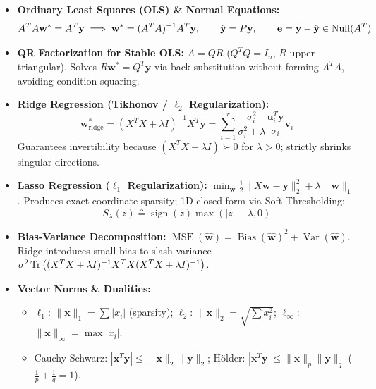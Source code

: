 \begin{tcolorbox}[breakable, colback=primarylight!30, colframe=primarydark, title={\large \textbf{1. Linear Algebra, Subspaces \& Regularized Regression (Weeks 1, 3--4)}}]
\begin{itemize}[leftmargin=*, noitemsep, topsep=2pt]
\begin{itemize}[leftmargin=*, noitemsep]
    \end{itemize}
    \item \textbf{Ordinary Least Squares (OLS) \& Normal Equations:}
    \begin{equation*}
    A^T A \mathbf{w}^* = A^T \mathbf{y} \implies \mathbf{w}^* = (A^T A)^{-1} A^T \mathbf{y}, \qquad \hat{\mathbf{y}} = P\mathbf{y}, \qquad \mathbf{e} = \mathbf{y} - \hat{\mathbf{y}} \in \operatorname{Null}(A^T)
    \end{equation*}
    \item \textbf{QR Factorization for Stable OLS:} $A = QR$ ($Q^T Q = I_n$, $R$ upper triangular). Solves $R \mathbf{w}^* = Q^T \mathbf{y}$ via back-substitution without forming $A^T A$, avoiding condition squaring.
    \item \textbf{Ridge Regression (Tikhonov / $\ell_2$ Regularization):}
    \begin{equation*}
    \mathbf{w}_{\text{ridge}}^* = (X^T X + \lambda I)^{-1} X^T \mathbf{y} = \sum_{i=1}^r \frac{\sigma_i^2}{\sigma_i^2 + \lambda} \frac{\mathbf{u}_i^T \mathbf{y}}{\sigma_i} \mathbf{v}_i
    \end{equation*}
    Guarantees invertibility because $(X^T X + \lambda I) \succ 0$ for $\lambda > 0$; strictly shrinks singular directions.
    \item \textbf{Lasso Regression ($\ell_1$ Regularization):} $\min_{\mathbf{w}} \frac{1}{2}\|X\mathbf{w} - \mathbf{y}\|_2^2 + \lambda \|\mathbf{w}\|_1$. Produces exact coordinate sparsity; 1D closed form via Soft-Thresholding:
    \begin{equation*}
    S_\lambda(z) \triangleq \operatorname{sign}(z)\max(|z| - \lambda, 0)
    \end{equation*}
    \item \textbf{Bias-Variance Decomposition:} $\operatorname{MSE}(\hat{\mathbf{w}}) = \operatorname{Bias}(\hat{\mathbf{w}})^2 + \operatorname{Var}(\hat{\mathbf{w}})$. Ridge introduces small bias to slash variance $\sigma^2 \operatorname{Tr}\big((X^T X + \lambda I)^{-1} X^T X (X^T X + \lambda I)^{-1}\big)$.
    \item \textbf{Vector Norms \& Dualities:}
    \begin{itemize}[leftmargin=*, noitemsep]
        \item $\ell_1$: $\|\mathbf{x}\|_1 = \sum |x_i|$ (sparsity); $\ell_2$: $\|\mathbf{x}\|_2 = \sqrt{\sum x_i^2}$; $\ell_\infty$: $\|\mathbf{x}\|_\infty = \max |x_i|$.
        \item Cauchy-Schwarz: $|\mathbf{x}^T \mathbf{y}| \le \|\mathbf{x}\|_2 \|\mathbf{y}\|_2$; Hölder: $|\mathbf{x}^T \mathbf{y}| \le \|\mathbf{x}\|_p \|\mathbf{y}\|_q$ ($\frac{1}{p} + \frac{1}{q} = 1$).

\end{itemize}
\end{itemize}
\end{tcolorbox}
